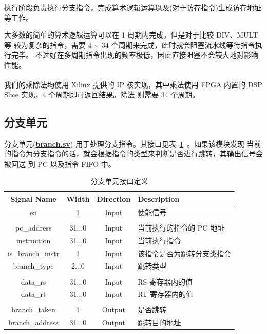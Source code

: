 \documentclass[blue,normal,cn,hide]{elegantbook}
\begin{document}
执行阶段负责执行分支指令，完成算术逻辑运算以及(对于访存指令)生成访存地址
等工作。

大多数的简单的算术逻辑运算可以在 1 周期内完成，但是对于比较 DIV、MULT 等
较为复杂的指令，需要 4 \textasciitilde\  34 个周期来完成，此时就会阻塞流水线等待指令执行完毕。
不过好在多周期指令出现的频率极低，因此直接阻塞不会较大地对影响性能。

我们的乘除法均使用 Xilinx\textsuperscript{\textregistered} 提供的 IP
核实现，其中乘法使用 FPGA 内置的 DSP Slice 实现，4 个周期即可返回结果。除法
则需要 34 个周期。

\subsection{分支单元}

分支单元(\href{https://github.com/name1e5s/Sirius/blob/master/branch.sv}{\textbf{branch.sv}})
用于处理分支指令。其接口见表~\ref{tab:BranchUnitInterface}~。如果该模块发现
当前的指令为分支指令的话，就会根据指令的类型来判断是否进行跳转，其输出信号会被回送
到 PC 以及指令 FIFO 中。

\begin{table}
    \renewcommand\arraystretch{1.25}
    \centering
    \begin{tabular}{cccm{}}
        \toprule 
        \rowcolor{black!20} \textbf{Signal Name} & \textbf{Width} & \textbf{Direction} & \textbf{Description} \\
        \midrule
        en & 1 & Input & 使能信号 \\
        \\
        pc\_address & 31...0 & Input & 当前执行的指令的 PC 地址 \\
        instruction & 31...0 & Input & 当前执行指令 \\
        is\_branch\_instr & 1 & Input & 该指令是否为跳转分支类指令 \\
        branch\_type & 2...0 & Input & 跳转类型 \\
        \\
        data\_rs & 31...0 & Input & RS 寄存器内的值 \\
        data\_rt & 31...0 & Input & RT 寄存器内的值 \\
        \\
        branch\_taken & 1 & Output & 是否跳转 \\
        branch\_address & 31...0 & Output & 跳转目的地址 \\
        \bottomrule
    \end{tabular}
    \caption{分支单元接口定义}
    \label{tab:BranchUnitInterface}
\end{table}
\end{document}
